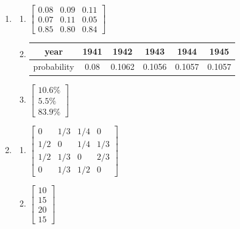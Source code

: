 \documentclass{article}
\begin{document}
\begin{enumerate}
\begin{enumerate}
		      \item 0.32
		      \item $\begin{bmatrix}0.2457\\0.5039\\0.2504\end{bmatrix}$
		      \item $\begin{bmatrix}0.25\\0.5\\0.25\end{bmatrix}$
	      \end{enumerate}
	\item \begin{enumerate}
		      \item $\begin{bmatrix}0.08&0.09&0.11\\0.07&0.11&0.05\\0.85&0.80&0.84\end{bmatrix}$
		      \item             \begin{tabular}{cccccc}
			            year        & 1941 & 1942   & 1943   & 1944   & 1945   \\
			            \midrule
			            probability & 0.08 & 0.1062 & 0.1056 & 0.1057 & 0.1057 \\
		            \end{tabular}
		      \item $\begin{bmatrix}10.6\%\\5.5\%\\83.9\%\end{bmatrix}$
	      \end{enumerate}
	\item \begin{enumerate}
		      \item $\begin{bmatrix}
				            0   & 1/3 & 1/4 & 0   \\
				            1/2 & 0   & 1/4 & 1/3 \\
				            1/2 & 1/3 & 0   & 2/3 \\
				            0   & 1/3 & 1/2 & 0
			            \end{bmatrix}$
		      \item $\begin{bmatrix}10\\15\\20\\15\end{bmatrix}$

\end{enumerate}
\end{enumerate}
\end{document}
